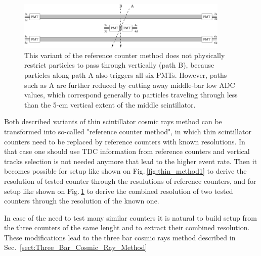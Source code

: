 \begin{figure}[]
\centering
\includegraphics[width=0.9\textwidth]{gleb/fig_gleb_thin_scintillator/thin_method2.pdf}
\caption{This variant of the reference counter method does not physically restrict particles to pass
through vertically (path B), because particles along path A also triggers all six PMTs. However,
paths such as A are further reduced by cutting away middle-bar low ADC values, which correspond
generally to particles traveling through less than the 5-cm vertical extent of the middle scintillator.\label{fig:thin_method2}}
\end{figure}


Both described variants of thin scintillator cosmic rays method can be transformed into so-called "reference counter method", in which thin scintillator counters need to be replaced by reference counters with known resolutions. In that case one should use TDC information from reference counters and vertical tracks selection is not needed anymore that lead to the higher event rate. Then it becomes possible for setup like shown on Fig.$\:$\ref{fig:thin_method1} to derive the resolution of tested counter through the resulutions of reference counters, and for setup like shown on Fig.$\:$\ref{fig:thin_method2}  to derive the combined resolution of two tested counters through the resolution of the known one. 

In case of the need to test many similar counters it is natural to build setup from the three counters of the same lenght and to extract their combined resolution. These modifications lead to the three bar cosmic rays method described in Sec.~\ref{sect:Three_Bar_Cosmic_Ray_Method}
